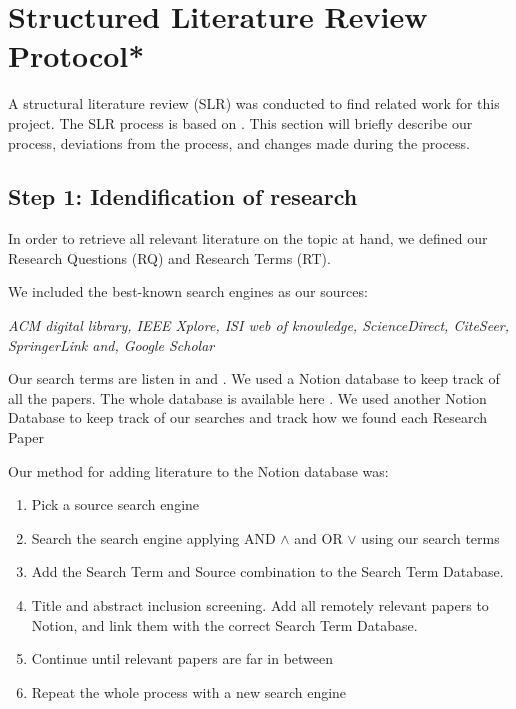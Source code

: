 
\section{Structured Literature Review Protocol*}
\label{section:BT:SLR}

A structural literature review (SLR) was conducted to find related work for this project.
The SLR process is based on \cite{AndersKofod-Petersen2018}.
This section will briefly describe our process, deviations from the process,
and changes made during the process.

\subsection{Step 1: Idendification of research}
In order to retrieve all relevant literature on the topic at hand, we defined our
Research Questions (RQ) and Research Terms (RT).

We included the best-known search engines as our sources:

\textit{
  ACM digital library,
  IEEE Xplore,
  ISI web of knowledge,
  ScienceDirect,
  CiteSeer,
  SpringerLink and,
  Google Scholar
}

Our search terms are listen in  and .
We used a Notion database to keep track of all the papers. The whole database is available here
\cite{slrdatabase}.
We used another Notion Database to keep track of our searches and track how we found each Research Paper
\cite{searchtermtable}

Our method for adding literature to the Notion database was:
\begin{enumerate}
  \item Pick a source search engine
  \item Search the search engine applying AND $\wedge$ and OR $\vee$ using our search terms
  \item Add the Search Term and Source combination to the Search Term Database.
  \item Title and abstract inclusion screening. Add all remotely relevant papers to Notion, and link them with the correct Search Term Database.
  \item Continue until relevant papers are far in between
  \item Repeat the whole process with a new search engine
\end{enumerate}

